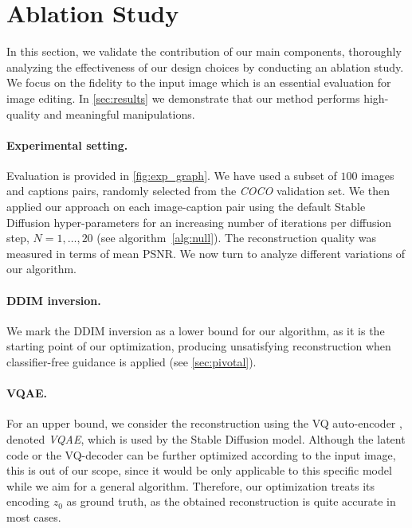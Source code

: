 









\section{Ablation Study}
\label{sec:ablation}
\vspace{-0.1cm}



In this section, we validate the contribution of our main components, thoroughly analyzing the effectiveness of our design choices by conducting an ablation study. We focus on the fidelity to the input image which is an essential evaluation for image editing. In \cref{sec:results} we demonstrate that our method performs high-quality and meaningful manipulations.




\vspace{-0.4cm}
\paragraph{Experimental setting.} Evaluation is provided in \cref{fig:exp_graph}. We have used a subset of $100$ images and captions pairs, randomly selected from the \textit{COCO} \cite{chen2015microsoft} validation set.
We then applied our approach on each image-caption pair using the default Stable Diffusion hyper-parameters for an increasing number of iterations per diffusion step, $N=1,\ldots,20$ (see algorithm~\ref{alg:null}). The reconstruction quality was measured in terms of mean PSNR. We now turn to analyze different variations of our algorithm. 

\vspace{-0.4cm}
\paragraph{DDIM inversion.} We mark the DDIM inversion as a lower bound for our algorithm, as it is the starting point of our optimization, producing unsatisfying reconstruction when classifier-free guidance is applied (see \cref{sec:pivotal}).

\vspace{-0.4cm}
\paragraph{VQAE.} For an upper bound, we consider the reconstruction using the VQ auto-encoder \cite{esser2020taming}, denoted \textit{VQAE}, which is used by the Stable Diffusion model. Although the latent code or the VQ-decoder can be further optimized according to the input image, this is out of our scope, since it would be only applicable to this specific model \cite{rombach2021highresolution} while we aim for a general algorithm. Therefore, our optimization treats its encoding $z_0$ as ground truth, as the obtained reconstruction is quite accurate in most cases.


